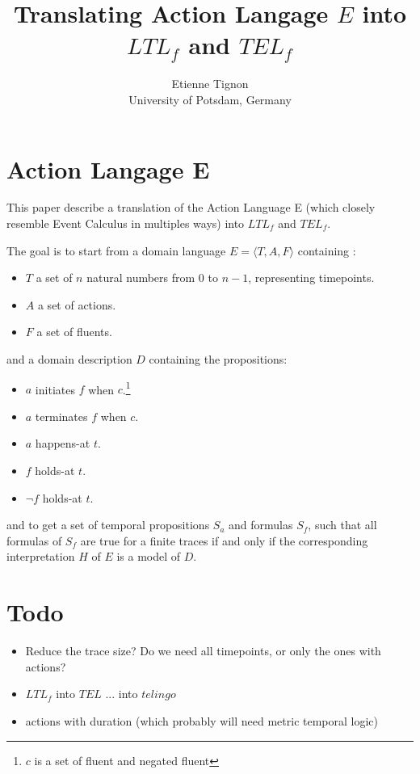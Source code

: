 \documentclass[a4paper]{article}
\begin{document}
\title{Translating Action Langage $E$ into $LTL_f$ and $TEL_f$}

\author{%
  Etienne Tignon\\
  University of Potsdam, Germany
}

\maketitle

\section{Action Langage E}
This paper describe a translation of the Action Language E (which closely resemble Event Calculus in multiples ways) into $LTL_f$ and $TEL_f$.

The goal is to start from a domain language $E=\langle T,A,F\rangle$ containing :
\begin{itemize}
  \item $T$ a set of $n$ natural numbers from $0$ to $n-1$, representing timepoints.
  \item $A$ a set of actions.
  \item $F$ a set of fluents.
\end{itemize}
and a domain description $D$ containing the propositions:
\begin{itemize}
  \item $a$ initiates $f$ when $c$.\footnote{$c$ is a set of fluent and negated fluent}
  \item $a$ terminates $f$ when $c$.\footnotemark[1]
  \item $a$ happens-at $t$.
  \item $f$ holds-at $t$.
  \item $\neg f$ holds-at $t$.
\end{itemize}

and to get a set of temporal propositions $S_a$ and formulas $S_f$, such that all formulas of $S_f$ are true for a finite traces if and only if the corresponding interpretation $H$ of $E$ is a model of $D$.





%
%
%
%
%

\section{Todo}

\begin{itemize}
  \item Reduce the trace size? Do we need all timepoints, or only the ones with actions?
  \item $LTL_f$ into $TEL$ ... into $telingo$
  \item actions with duration (which probably will need metric temporal logic)
\end{itemize}

\printbibliography{}
\end{document}
